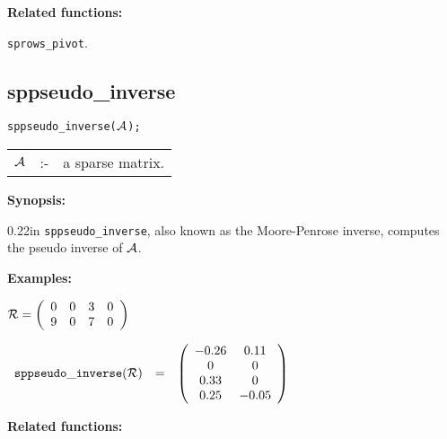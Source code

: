{\bf Related functions:}

\hspace*{0.175in} {\tt sprows\_pivot}.


\subsection{sppseudo\_inverse}

\hspace*{0.175in} {\tt sppseudo\_inverse(${\cal A}$);}

\hspace*{0.1in}  
\begin{tabular}{l l l} 
${\cal A}$ &:-& a sparse matrix.
\end{tabular}

{\bf Synopsis:} 

\begin{addtolength}{\leftskip}{0.22in}
{\tt sppseudo\_inverse}, also known as the Moore-Penrose inverse, computes
the pseudo inverse of ${\cal A}$. 

\end{addtolength}

{\bf Examples:}

\begin{flushleft}
\hspace*{0.175in}
\begin{math}  
{\cal R} = \left( \begin{array}{cccc} 0 & 0 & 3 & 0 \\ 9 & 0 & 7 & 0
\end{array} \right)
\end{math}  
\end{flushleft}

\begin{flushleft}  
\hspace*{0.1in}
\begin{math}  
\begin{array}{ccc}
{\tt sppseudo\_inverse}({\cal R}) & = & 
        \left( \begin{array}{cc} -0.26 & 0.11 \\ 0 & 0 \\ 0.33 & 0 
\\ 0.25 & -0.05 
 \end{array} \right) 
\end{array}
\end{math}  
\end{flushleft}

{\bf Related functions:}

